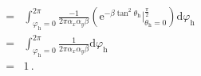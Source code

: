\begin{prove}
\begin{align}
        = & \int_{\varphi_{\mathrm{h}}=0}^{2\pi}\frac{-1}{2\pi\alpha_x\alpha_y\beta}\left(\mathrm{e}^{-\beta \tan^2\theta_{\mathrm{h}}}\bigg|_{\theta_{\mathrm{h}}=0}^{\frac{\pi}{2}}\right)\mathrm{d}\varphi_{\mathrm{h}}\nonumber                                                                                                                                                         \\
        = & \int_{\varphi_{\mathrm{h}}=0}^{2\pi}\frac{1}{2\pi\alpha_x\alpha_y\beta}\mathrm{d}\varphi_{\mathrm{h}}\nonumber                                                                                                                                                                                                                                                                  \\
        = & 1\, .
    \end{align}
\end{prove}

